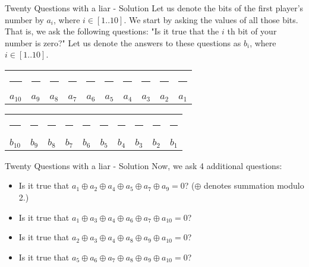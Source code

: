 \documentclass{beamer}
\begin{document}
\begin{frame}{Twenty Questions with a liar - Solution}
    Let us denote the bits of the first player's number by $a_i$, where $i \in [1..10]$. We start by asking the values of all those bits. That is, we ask the following questions: "Is it true that the $i$ th bit of your number is zero?" Let us denote the answers to these questions as $b_i$, where $i \in [1..10]$.

    \vspace{1cm}

    \centering
    \begin{tabular}{cccccccccc}
        \rule{0.5cm}{1.5pt} & \rule{0.5cm}{1.5pt} & \rule{0.5cm}{1.5pt} & \rule{0.5cm}{1.5pt} & \rule{0.5cm}{1.5pt} & \rule{0.5cm}{1.5pt} & \rule{0.5cm}{1.5pt} & \rule{0.5cm}{1.5pt} & \rule{0.5cm}{1.5pt} & \rule{0.5cm}{1.5pt} \\
        $a_{10}$ & $a_9$ & $a_8$ & $a_7$ & $a_6$ & $a_5$ & $a_4$ & $a_3$ & $a_2$ & $a_1$
    \end{tabular}

    \vspace{1cm}

    \centering
    \begin{tabular}{cccccccccc}
        \rule{0.5cm}{1.5pt} & \rule{0.5cm}{1.5pt} & \rule{0.5cm}{1.5pt} & \rule{0.5cm}{1.5pt} & \rule{0.5cm}{1.5pt} & \rule{0.5cm}{1.5pt} & \rule{0.5cm}{1.5pt} & \rule{0.5cm}{1.5pt} & \rule{0.5cm}{1.5pt} & \rule{0.5cm}{1.5pt} \\
        $b_{10}$ & $b_9$ & $b_8$ & $b_7$ & $b_6$ & $b_5$ & $b_4$ & $b_3$ & $b_2$ & $b_1$
    \end{tabular}
\end{frame}


\begin{frame}{Twenty Questions with a liar - Solution}
    Now, we ask 4 additional questions: \begin{itemize}
        \item Is it true that $a_1 \oplus a_2 \oplus a_4 \oplus a_5 \oplus a_7 \oplus a_9 = 0$? ($\oplus$ denotes summation modulo 2.)
        \item Is it true that $a_1 \oplus a_3 \oplus a_4 \oplus a_6 \oplus a_7 \oplus a_{10} = 0$?
        \item Is it true that $a_2 \oplus a_3 \oplus a_4 \oplus a_8 \oplus a_9 \oplus a_{10} = 0$?
        \item Is it true that $a_5 \oplus a_6 \oplus a_7 \oplus a_8 \oplus a_9 \oplus a_{10} = 0$?
    \end{itemize}
\end{frame}
\end{document}
